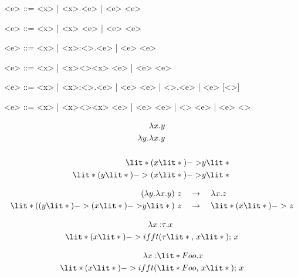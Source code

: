 \documentclass[11hpt]{article}
\begin{document}
\begin{grammar}
  <e> ::= <x> | <\lambda x>.<e> | <e> <e>
\end{grammar}

\begin{grammar}
  <e> ::= <x> | \lit*{(}<x>\lit*{) ->} <e> | <e> <e>
\end{grammar}

\begin{grammar}
  <e> ::= <x> | <\lambda x>:<\tau>.<e> | <e> <e>
\end{grammar}

\begin{grammar}
  <e> ::= <x> | \lit*{(}<x><\tau>\lit*{,}<x>\lit*{);} <e> | <e> <e>
\end{grammar}

\begin{grammar}
  <e> ::= <x> | <\lambda x>:<\tau>.<e> | <e> <e> | <\Lambda \alpha>.<e> | <e> [<\tau>]
\end{grammar}

\begin{grammar}
  <e> ::= <x>
       | \lit*{(}<x><\tau>\lit*{,}<x>\lit*{);} <e>
       | <e> <e>
       | \lit*{(}<\alpha>\lit*{) ->} <e>
       | <e> <\tau>
\end{grammar}

\begin{align*}
\lambda &x.y \\
\lambda y.\lambda &x.y \\ \\
\lit*{(}&x\lit*{) -> }y\lit*{} \\
\lit*{(}y\lit*{) -> (}&x\lit*{) -> }y\lit*{}
\end{align*}

\begin{align*}
(\lambda y.\lambda x.y) \ z \quad &\to \quad \lambda x.z\\
\lit*{((}y\lit*{) -> (}x\lit*{) -> }y\lit*{)}\ z \quad &\to \quad \lit*{(}x\lit*{) ->}\ z
\end{align*}

 \begin{align*}
\lambda x:&\tau.x \\
\lit*{(}x\lit*{) -> ifft(}&\tau\lit*{,\ }x\lit*{);}\ x
\end{align*}

 \begin{align*}
\lambda x:&\lit*{Foo}.x \\
\lit*{(}x\lit*{) -> ifft(}&\lit*{Foo,\ }x\lit*{);}\ x
\end{align*}
\end{document}
